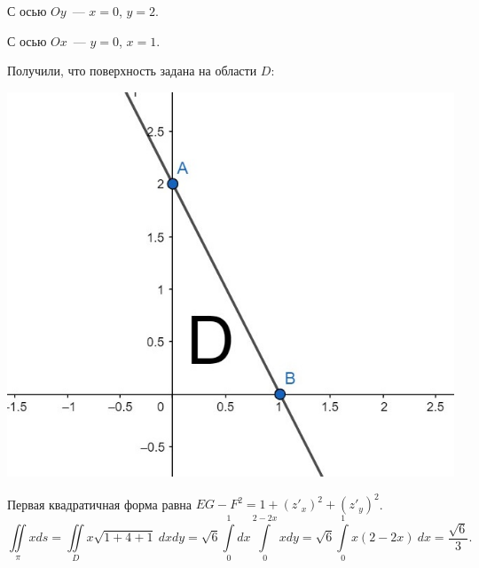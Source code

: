 \documentclass[../../main.tex]{subfiles}
\begin{document}
\begin{exmps}
\begin{enumerate}
	С осью $Oy$~--- $x = 0$, $y = 2$.
	
	С осью $Ox$~--- $y = 0$, $x = 1$.
	
	Получили, что поверхность задана на области $D$:
	
	\begin{center}
	 \includegraphics[scale = 0.2]{lec23-1.jpg}
	\end{center}

	Первая квадратичная форма равна $EG - F^2 = 1 + (z'_x)^2 + (z'_y)^2$.
	\[\iint \limits_\pi x ds = \iint \limits_D x \sqrt{1 + 4 +1} \  dx dy = 
	\sqrt{6}
	 \int \limits_0^1  dx \int \limits_0^{2 - 2x} x dy = \sqrt 6 \int \limits_0^1 
	 x(2 -2x) \ dx = \frac{\sqrt 6}{3}.\] 
	 \end{enumerate}
	\end{exmps}
\end{document}
